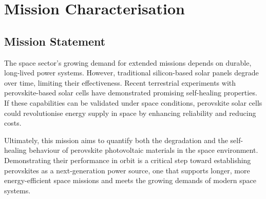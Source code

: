 \chapter{Mission Characterisation}
\label{chpt:mission-characterisation}

\section{Mission Statement}

The space sector's growing demand for extended missions depends on durable, long-lived power systems. However, traditional silicon-based solar panels degrade over time, limiting their effectiveness. Recent terrestrial experiments with perovskite-based solar cells have demonstrated promising self-healing properties. If these capabilities can be validated under space conditions, perovskite solar cells could revolutionise energy supply in space by enhancing reliability and reducing costs.

Ultimately, this mission aims to quantify both the degradation and the self-healing behaviour of perovskite photovoltaic materials in the space environment. Demonstrating their performance in orbit is a critical step toward establishing perovskites as a next-generation power source, one that supports longer, more energy-efficient space missions and meets the growing demands of modern space systems.